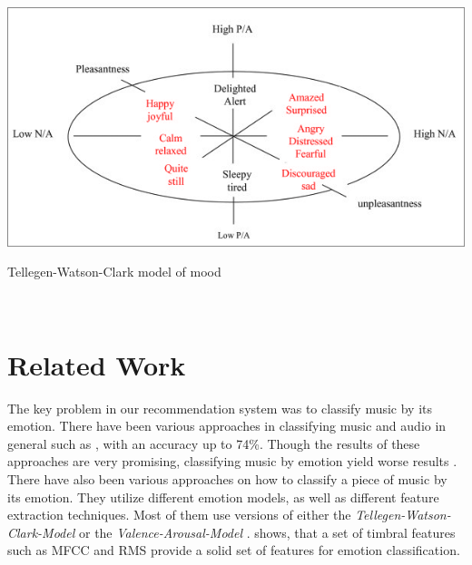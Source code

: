\documentclass{sigchi-ext}
\begin{document}
\begin{marginfigure}[0pc]
  \begin{minipage}{\marginparwidth}
    \centering
    \includegraphics[width=1.0\marginparwidth]{images/tellegen-watson-clark-model.png}
    \caption{Tellegen-Watson-Clark model of mood \cite{Tellegen1999}}~\label{fig:tellegen-watson-clark}
  \end{minipage}
\end{marginfigure}

\section{Related Work}
The key problem in our recommendation system was to classify music by its emotion. There have been various approaches in classifying music and audio in general such as \cite{Mckinney2003,Cook2007,Jeremic2015,Tzanetakis2002}, with an accuracy up to 74\%. Though the results of these approaches are very promising, classifying music by emotion yield worse results \cite{Kim2010}. There have also been various approaches on how to classify a piece of music by its emotion. They utilize different emotion models, as well as different feature extraction techniques. Most of them use versions of either the \textit{Tellegen-Watson-Clark-Model} \cite{Trohidis2011} or the \textit{Valence-Arousal-Model} \cite{Kim2011}. \cite{Kim2010} shows, that a set of timbral features such as MFCC and RMS provide a solid set of features for emotion classification.
\end{document}
